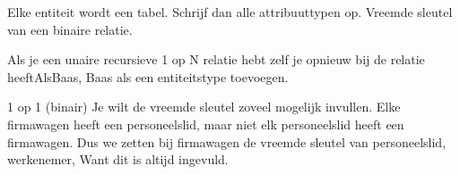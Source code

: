 \documentclass{article}
\begin{document}
Elke entiteit wordt een tabel. 
Schrijf dan alle attribuuttypen op.
Vreemde sleutel van een binaire relatie.

Als je een unaire recursieve 1 op N relatie hebt zelf je opnieuw bij de relatie heeftAlsBaas, Baas als een entiteitstype toevoegen.

1 op 1 (binair)
Je wilt de vreemde sleutel zoveel mogelijk invullen. 
Elke firmawagen heeft een personeelslid, maar niet elk personeelslid heeft een firmawagen.
Dus we zetten bij firmawagen de vreemde sleutel van personeelslid, werkenemer, Want dit is altijd ingevuld.
\end{document}
